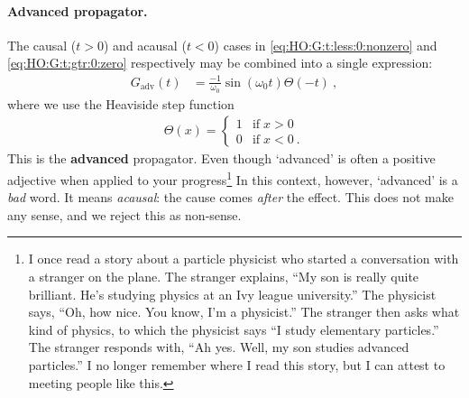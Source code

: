 \paragraph{Advanced propagator.}
The causal ($t>0$) and acausal ($t<0$) cases in \eqref{eq:HO:G:t:less:0:nonzero} and \eqref{eq:HO:G:t:gtr:0:zero} respectively may be combined into a single expression:
\begin{align}
	G_\text{adv}(t) &= \frac{-1}{\omega_0}\sin(\omega_0t) \Theta(-t) \ ,
	\label{eq:HO:G:adv:theta}
\end{align}
where we use the Heaviside step function
\begin{align}
	\Theta(x) = 
	\begin{cases}
	1 & \text{if}\; x>0\\
	0 & \text{if}\; x<0 \ .
	\end{cases}
	\label{eq:Heaviside:Theta}
\end{align}
This is the \textbf{advanced} propagator. Even though `advanced' is often a positive adjective when applied to your progress\footnote{I once read a story about a particle physicist who started a conversation with a stranger on the plane. The stranger explains, ``My son is really quite brilliant. He's studying physics at an Ivy league university.'' The physicist says, ``Oh, how nice. You know, I'm a physicist.''  The stranger then asks what kind of physics, to which the physicist says ``I study elementary particles.'' The stranger responds with, ``Ah yes. Well, my son studies advanced particles.'' I no longer remember where I read this story, but I can attest to meeting people like this.} In this context, however, `advanced' is a \emph{bad} word. It means \emph{acausal}: the cause comes \emph{after} the effect. This does not make any sense, and we reject this as non-sense. 

